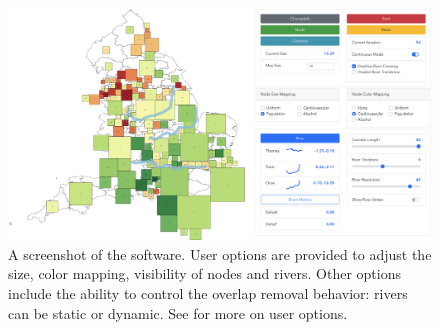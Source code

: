 {
\begin{figure}[tb!]
    \centering
    \includegraphics[width=\textwidth,keepaspectratio]{figure/UI.png}
    \caption{A screenshot of the software. User options are provided to adjust the size, color mapping, visibility of nodes and rivers. Other options include the ability to control the overlap removal behavior: rivers can be static or dynamic. See  for more on user options.}
    \label{fig:overview}
\end{figure}
}